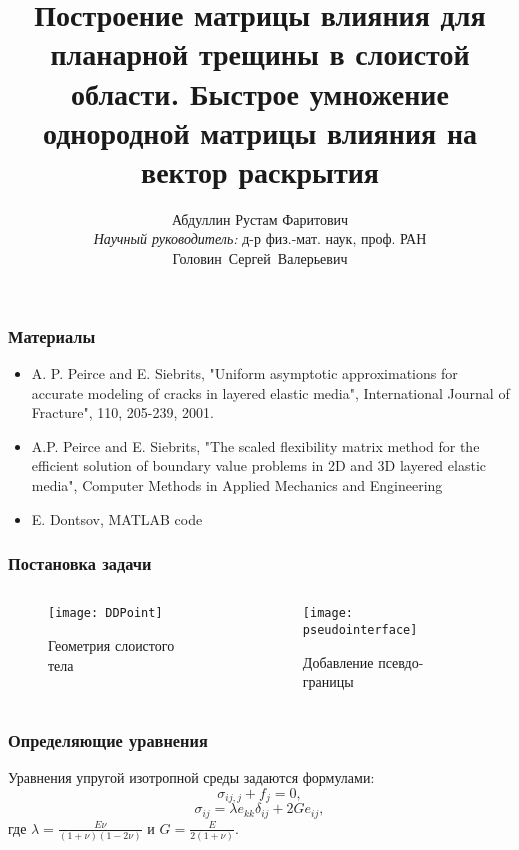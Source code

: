 \documentclass[10pt]{beamer}
\title[]{\large{Построение матрицы влияния для планарной трещины в слоистой области. Быстрое умножение однородной матрицы влияния на вектор раскрытия}}
\author[Абдуллин Р.Ф]{Абдуллин Рустам Фаритович \\[1cm]
{\emph{Научный руководитель:} д-р физ.-мат. наук, проф. РАН \mbox{Головин Сергей Валерьевич}}}
\institute[НГУ]
{
\vspace{0.5cm}
\begin{minipage}{0.5\linewidth}
  \begin{center}
  	\textbf{ НОВОСИБИРСКИЙ ГОСУДАРСТВЕННЫЙ УНИВЕРСИТЕТ, НГУ}
  \end{center}
\end{minipage}
}
\begin{document}
\begin{frame}
\titlepage 
\end{frame}


\begin{frame}
	\frametitle{Материалы}
	\begin{itemize}
		\item \footnotesize{A. P. Peirce and E. Siebrits, "Uniform asymptotic approximations 
		for accurate modeling of cracks in layered elastic media", International Journal of Fracture",
		110, 205-239, 2001.}
		\item \footnotesize{A.P. Peirce and E. Siebrits,
		"The scaled flexibility matrix method for the efficient solution of boundary value problems
		in 2D and 3D layered elastic media", Computer Methods in Applied Mechanics and Engineering}
		\item \footnotesize{E. Dontsov, MATLAB code}
	\end{itemize}
	
\end{frame}


\begin{frame}
\frametitle{Постановка задачи}
\begin{columns}
	\begin{column}{0.35\textwidth}
	    \begin{figure}
	    \texttt{[image: DDPoint]}
	    \caption{\footnotesize Геометрия слоистого тела}     
	    \end{figure}
	\end{column}

	\begin{column}{0.35\textwidth}
	    \begin{figure}
	    \texttt{[image: pseudointerface]}
	    \caption{\footnotesize Добавление псевдо-границы}     
	    \end{figure}
	\end{column}
\end{columns}
\end{frame}



\begin{frame}
\frametitle{Определяющие уравнения}
Уравнения упругой изотропной среды задаются формулами:
\begin{equation}
	\label{eq:equilibrium}
	\sigma_{ij,j} + f_j = 0,
\end{equation}
\begin{equation}		
	\label{eq:hooke}
	\sigma_{ij} = \lambda e_{kk}\delta_{ij} + 2G e_{ij},
\end{equation}
где $\lambda = \frac{E \nu}{(1+\nu)(1-2\nu)}$ и $ G = \frac{E}{2(1+\nu)} $.
\end{frame}
\end{document}
